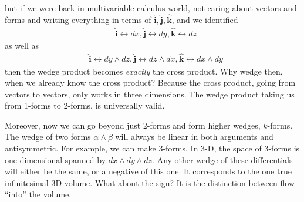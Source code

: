 \documentclass[../master.tex]{subfiles}
\begin{document}
	but if we were back in multivariable calculus world, not caring about vectors and forms and writing everything in terms of $\hat{\mathbf{i}}, \hat{\mathbf{j}}, \hat{\mathbf{k}}$, and we identified 
	\begin{align*}
		&\hat{\mathbf{i}} \leftrightarrow dx, \hat{\mathbf{j}} \leftrightarrow dy, \hat{\mathbf{k}} \leftrightarrow dz 
	\end{align*}
	as well as
	\begin{align*}
		&\hat{\mathbf{i}} \leftrightarrow dy \wedge dz, \hat{\mathbf{j}} \leftrightarrow dz \wedge dx, \hat{\mathbf{k}} \leftrightarrow dx \wedge dy
	\end{align*}
	then the wedge product becomes \emph{exactly} the cross product. Why wedge then, when we already know the cross product? Because the cross product, going from vectors to vectors, only works in three dimensions. The wedge product taking us from 1-forms to 2-forms, is universally valid.
	
	Moreover, now we can go beyond just 2-forms and form higher wedges, $k$-forms. The wedge of two forms $\alpha \wedge \beta$ will always be linear in both arguments and antisymmetric. For example, we can make 3-forms. In 3-D, the space of 3-forms is one dimensional spanned by $dx \wedge dy \wedge dz$. Any other wedge of these differentials will either be the same, or a negative of this one. It corresponds to the one true infinitesimal 3D volume. What about the sign? It is the distinction between flow ``into'' the volume.
	
	
\end{document}
